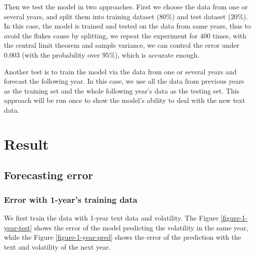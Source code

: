 \documentclass[11pt]{article}
\begin{document}
Then we test the model in two approaches. First we choose the data from one or several years, and split them into training dataset ($80\%$) and test dataset ($20\%$). In this case, the model is trained and tested on the data from same years, thus to avoid the flukes cause by splitting, we repeat the experiment for $400$ times, with the central limit theorem and sample variance, we can control the error under $0.003$ (with the probability over $95\%$), which is accurate enough.

Another test is to train the model via the data from one or several years and forecast the following year. In this case, we use all the data from previous years as the training set and the whole following year's data as the testing set. This approach will be run once to show the model's ability to deal with the new text data.

\section{Result}

\subsection{Forecasting error}

\subsubsection{Error with 1-year's training data}

We first train the data with 1-year text data and volatility. The Figure \ref{figure-1-year-test} shows the error of the model predicting the volatility in the same year, while the Figure \ref{figure-1-year-pred} shows the error of the prediction with the text and volatility of the next year.
\end{document}
